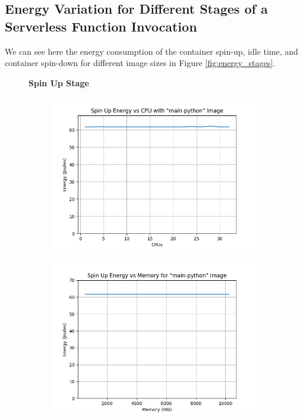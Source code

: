 \documentclass[times, 10pt,twocolumn]{article}
\begin{document}
 \subsection{Energy Variation for Different Stages of a Serverless Function Invocation}
 \label{appendix:energy_variation_vcpu_memory}
 We can see here the energy consumption of the container spin-up, idle time, and container spin-down for different image sizes in Figure \ref{fig:energy_stages}. 

 \begin{figure}[ht]
   \centering
   \textbf{Spin Up Stage}\par\medskip
   \begin{subfigure}[b]{0.3\textwidth}
     \includegraphics[width=\textwidth]{imgs/container_study/spin_up_vs_cpu.png}
     \caption{}
     \label{fig:spin_up_cpu}
   \end{subfigure}
   \hfill
   \begin{subfigure}[b]{0.3\textwidth}
      \includegraphics[width=\textwidth]{imgs/container_study/spin_up_vs_mem.png}

\end{subfigure}
\end{figure}
\end{document}
